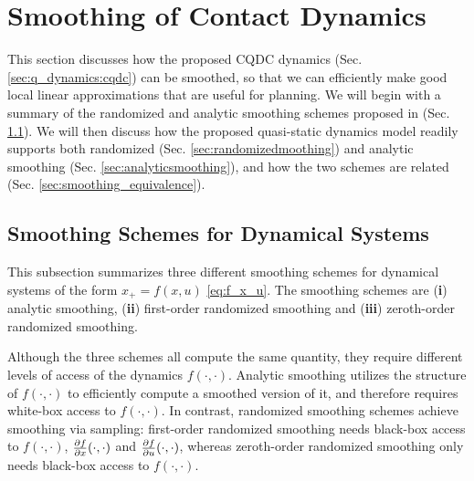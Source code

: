\newpage
\section{Smoothing of Contact Dynamics} \label{sec:smoothing}
This section discusses how the proposed CQDC dynamics (Sec. \ref{sec:q_dynamics:cqdc}) can be smoothed, so that we can efficiently make good local linear approximations that are useful for planning.
We will begin with a summary of the randomized and analytic smoothing schemes proposed in \cite[Section II]{pang2022global} (Sec. \ref{sec:smoothdynamics}). 
We will then discuss how the proposed quasi-static dynamics model readily supports both randomized (Sec. \ref{sec:randomizedmoothing}) and analytic smoothing (Sec. \ref{sec:analyticsmoothing}), and how the two schemes are related (Sec. \ref{sec:smoothing_equivalence}). 


\subsection{Smoothing Schemes for Dynamical Systems}
\label{sec:smoothdynamics}
This subsection summarizes three different smoothing schemes for dynamical systems of the form $x_+ = f(x, u)$ \eqref{eq:f_x_u}. The smoothing schemes are (\textbf{i}) analytic smoothing, (\textbf{ii}) first-order randomized smoothing and (\textbf{iii}) zeroth-order randomized smoothing.

Although the three schemes all compute the same quantity, they require different levels of access of the dynamics $f(\cdot, \cdot)$. Analytic smoothing utilizes the structure of $f(\cdot, \cdot)$ to efficiently compute a smoothed version of it, and therefore requires white-box access to $f(\cdot, \cdot)$. In contrast, randomized smoothing schemes achieve smoothing via sampling: first-order randomized smoothing needs black-box access to $f(\cdot, \cdot)$, $\frac{\partial {f}}{\partial {x}}(\cdot, \cdot)$ and $\frac{\partial {f}}{\partial {u}}(\cdot, \cdot)$, whereas zeroth-order randomized smoothing only needs black-box access to $f(\cdot, \cdot)$.

